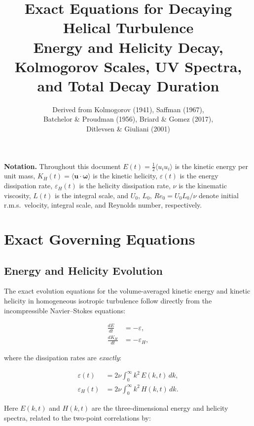 \documentclass[12pt,a4paper]{article}
\title{%
  \textbf{Exact Equations for Decaying Helical Turbulence}\\[6pt]
  \large Energy and Helicity Decay, Kolmogorov Scales, UV Spectra,\\
  and Total Decay Duration
}
\author{Derived from Kolmogorov (1941), Saffman (1967),\\
  Batchelor \& Proudman (1956), Briard \& Gomez (2017),\\
  Ditlevsen \& Giuliani (2001)}
\date{}
\newcommand{\eps}{\varepsilon}
\newcommand{\epsh}{\varepsilon_{H}}
\newcommand{\Reu}{Re_{0}}
\newcommand{\KH}{K_{H}}
\theoremstyle{plain}
\theoremstyle{definition}
\begin{document}

\maketitle
\tableofcontents

\bigskip
\noindent\textbf{Notation.}
Throughout this document $E(t) = \tfrac{1}{2}\langle u_i u_i\rangle$ is the
kinetic energy per unit mass, $\KH(t) = \langle \bm{u}\cdot\bm{\omega}\rangle$
is the kinetic helicity, $\eps(t)$ is the energy dissipation rate,
$\epsh(t)$ is the helicity dissipation rate, $\nu$ is the kinematic
viscosity, $L(t)$ is the integral scale, and $U_0,\,L_0,\,\Reu = U_0 L_0/\nu$
denote initial r.m.s.\ velocity, integral scale, and Reynolds number,
respectively.

\section{Exact Governing Equations}

\subsection{Energy and Helicity Evolution}

The exact evolution equations for the volume-averaged kinetic energy
and kinetic helicity in homogeneous isotropic turbulence follow
directly from the incompressible Navier--Stokes equations:

\begin{align}
  \frac{dE}{dt} &= -\eps, \label{eq:energy_exact}\\[6pt]
  \frac{d\KH}{dt} &= -\epsh, \label{eq:helicity_exact}
\end{align}

where the dissipation rates are \emph{exactly}:

\begin{align}
  \eps(t) &= 2\nu \int_0^{\infty} k^2\, E(k,t)\,dk, \label{eq:eps_def}\\[6pt]
  \epsh(t) &= 2\nu \int_0^{\infty} k^2\, H(k,t)\,dk. \label{eq:epsh_def}
\end{align}

Here $E(k,t)$ and $H(k,t)$ are the three-dimensional energy and
helicity spectra, related to the two-point correlations by:
\end{document}
